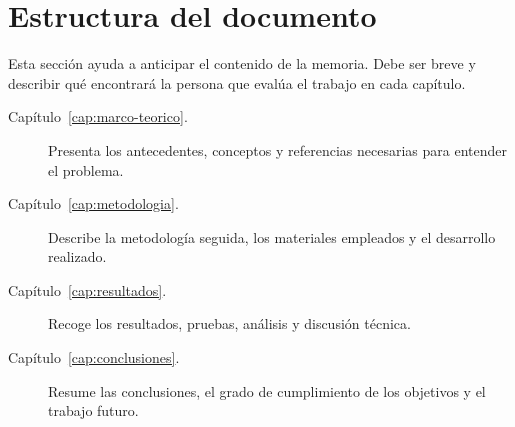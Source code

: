 \section{Estructura del documento}
\label{sec:estructura-documento}

Esta sección ayuda a anticipar el contenido de la memoria. Debe ser breve y
describir qué encontrará la persona que evalúa el trabajo en cada capítulo.

\begin{description}
    \item[Capítulo~\ref{cap:marco-teorico}.] Presenta los antecedentes, conceptos y referencias necesarias para entender el problema.
    \item[Capítulo~\ref{cap:metodologia}.] Describe la metodología seguida, los materiales empleados y el desarrollo realizado.
    \item[Capítulo~\ref{cap:resultados}.] Recoge los resultados, pruebas, análisis y discusión técnica.
    \item[Capítulo~\ref{cap:conclusiones}.] Resume las conclusiones, el grado de cumplimiento de los objetivos y el trabajo futuro.
\end{description}
